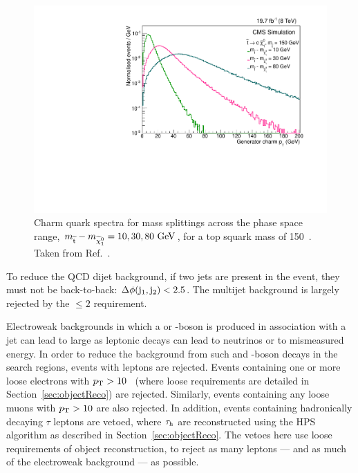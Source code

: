 \begin{figure}%
  \begin{center}
  \includegraphics[scale=0.45]{Figures/sus13009/charmpt.pdf}
  \caption{Charm quark \pt{} spectra for mass splittings across the phase space range, $m_{\widetilde{{\rm t}}}-m_{\widetilde{\chi}^{0}_{1}}=10, 30, 80~\mathrm{GeV}$, for a top squark mass of 150~\GeV. Taken from Ref.~\cite{sus14001}.
         \label{stopj2pT}}
  \end{center}
\end{figure}

To reduce the \ac{QCD} dijet background, if two jets are present in the event, they must not be back-to-back: 
$\Delta \phi ({\rm j}_1,{\rm j}_2) < 2.5$. 
The multijet background is largely rejected by the \njets$\le2$ requirement.

Electroweak backgrounds in which a \W{} or \Z{}-boson is produced in association with a jet can lead to large \MET as leptonic decays can lead to neutrinos or to mismeasured energy.
In order to reduce the background from such \Z{} and \W-boson decays in the search regions, events
with leptons are rejected. 
Events containing one or more loose electrons with $p_{\text{T}} > 10$~\GeV{} (where loose requirements are detailed in Section~\ref{sec:objectReco}) are rejected. 
Similarly, events containing any loose muons with $p_{\text{T}} > 10$ \GeV{} are also rejected. 
In addition, events containing hadronically decaying $\tau$ leptons are vetoed, where $\tau_\mathrm{h}$ are reconstructed using the \ac{HPS} algorithm as described in Section~\ref{sec:objectReco}.
The vetoes here use loose requirements of object reconstruction, to reject as many leptons --- and as much of the electroweak background --- as possible.

